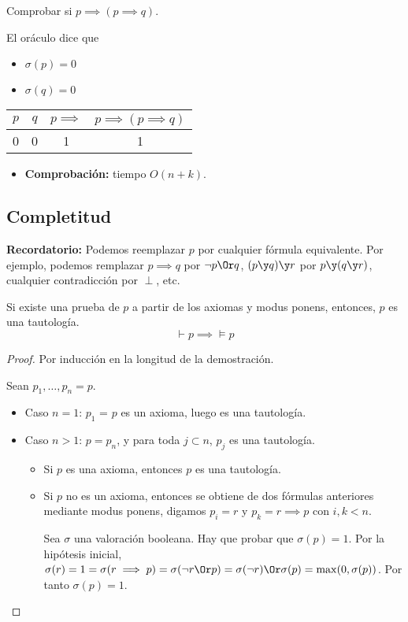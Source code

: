 \begin{example}
	Comprobar si $p\implies (p\implies q)$.

	El oráculo dice que
	\vspace{-3mm}
	\begin{itemize}
		\item $\sigma(p) = 0$
		\item $\sigma(q) = 0$
	\end{itemize}
	\begin{center}
		\begin{tabular}{|c|c|c|c|}
			\hline
			$p$ & $q$ & $p\implies$ & $p\implies(p\implies q)$\\
			\hline
			0 & 0 & 1 & 1\\
			\hline
		\end{tabular}
	\end{center}
	\begin{itemize}
		\item \textbf{Comprobación:} tiempo $O(n+k)$.
	\end{itemize}
\end{example}
\subsection{Completitud}
\textbf{Recordatorio:} Podemos reemplazar $p$ por cualquier fórmula equivalente. Por ejemplo, podemos remplazar $p\implies q$ por $\neg p \Or q$, $(p\y q)\y r$ por $p\y (q\y r)$, cualquier contradicción por $\perp$, etc.

\begin{theorem}
	Si existe una prueba de $p$ a partir de los axiomas y modus ponens, entonces, $p$ es una tautología.
	$$\vdash p \implies \vDash p$$
\end{theorem}
\begin{proof}
	Por inducción en la longitud de la demostración.

	Sean $p_1,\hdots, p_n=p$.
	\begin{itemize}
		\item Caso $n=1$: $p_1$ = $p$ es un axioma, luego es una tautología.
		\item Caso $n>1$: $p=p_n$, y para toda $j\subset n$, $p_j$ es una tautología.
		\begin{itemize}
			\item Si $p$ es una axioma, entonces $p$ es una tautología.
			\item Si $p$ no es un axioma, entonces se obtiene de dos fórmulas anteriores mediante modus ponens, digamos $p_i = r$ y $p_k=r\implies p$ con $i,k<n$.

			Sea $\sigma$ una valoración booleana. Hay que probar que $\sigma(p) = 1$. Por la hipótesis inicial, $\sigma(r) = 1 = \sigma(r\implies p) = \sigma(\neg r \Or p) = \sigma(\neg r) \Or \sigma(p) = \max(0,\sigma(p))$.
			Por tanto $\sigma(p) = 1$.
		\end{itemize}
	\end{itemize}
\end{proof}

